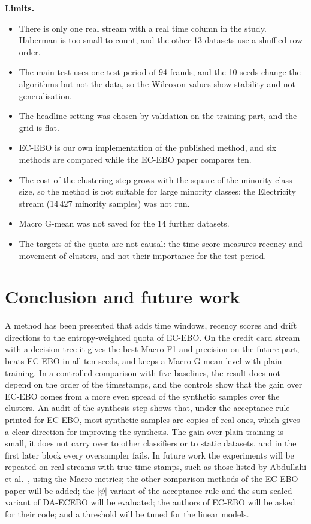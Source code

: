 \documentclass[preprint,10pt]{elsarticle}
\begin{document}
\textbf{Limits.}
\begin{itemize}
\item There is only one real stream with a real time column in the study. Haberman is too small to count, and the other 13 datasets use a shuffled row order.
\item The main test uses one test period of 94 frauds, and the 10 seeds change the algorithms but not the data, so the Wilcoxon values show stability and not generalisation.
\item The headline setting was chosen by validation on the training part, and the grid is flat.
\item EC-EBO is our own implementation of the published method, and six methods are compared while the EC-EBO paper compares ten.
\item The cost of the clustering step grows with the square of the minority class size, so the method is not suitable for large minority classes; the Electricity stream (14\,427 minority samples) was not run.
\item Macro G-mean was not saved for the 14 further datasets.
\item The targets of the quota are not causal: the time score measures recency and movement of clusters, and not their importance for the test period.
\end{itemize}

\section{Conclusion and future work}\label{sec:conclusion}
A method has been presented that adds time windows, recency scores and drift directions to the entropy-weighted quota of EC-EBO. On the credit card stream with a decision tree it gives the best Macro-F1 and precision on the future part, beats EC-EBO in all ten seeds, and keeps a Macro G-mean level with plain training. In a controlled comparison with five baselines, the result does not depend on the order of the timestamps, and the controls show that the gain over EC-EBO comes from a more even spread of the synthetic samples over the clusters. An audit of the synthesis step shows that, under the acceptance rule printed for EC-EBO, most synthetic samples are copies of real ones, which gives a clear direction for improving the synthesis. The gain over plain training is small, it does not carry over to other classifiers or to static datasets, and in the first later block every oversampler fails. In future work the experiments will be repeated on real streams with true time stamps, such as those listed by Abdullahi et al.~\cite{abdullahi2025}, using the Macro metrics; the other comparison methods of the EC-EBO paper will be added; the $|\psi|$ variant of the acceptance rule and the sum-scaled variant of DA-ECEBO will be evaluated; the authors of EC-EBO will be asked for their code; and a threshold will be tuned for the linear models.
\end{document}
